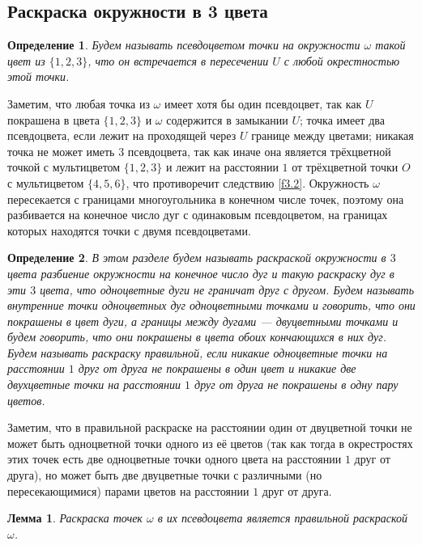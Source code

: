 \documentclass[12pt,a4paper]{article}
\newtheorem{mydef}{Определение}
\newtheorem{lemma}{Лемма}
\begin{document}
\subsection{Раскраска окружности в 3 цвета}

\begin{mydef}
	Будем называть псевдоцветом точки на окружности $\omega$ такой цвет из $\{1, 2, 3\}$, что он встречается в пересечении $U$ с любой окрестностью этой точки.
\end{mydef}

Заметим, что любая точка из $\omega$ имеет хотя бы один псевдоцвет, так как $U$ покрашена в цвета $\{1, 2, 3\}$ и $\omega$ содержится в замыкании $U$; точка имеет два псевдоцвета, если лежит на проходящей через $U$ границе между цветами; никакая точка не может иметь $3$ псевдоцвета, так как иначе она является трёхцветной точкой с мультицветом $\{1, 2, 3\}$ и лежит на расстоянии $1$ от трёхцветной точки $O$ с мультицветом $\{4, 5, 6\}$, что противоречит следствию \ref{f3.2}. Окружность $\omega$ пересекается с границами многоугольника в конечном числе точек, поэтому она разбивается на конечное число дуг с одинаковым псевдоцветом, на границах которых находятся точки с двумя псевдоцветами.

\begin{mydef}
	В этом разделе будем называть раскраской окружности в $3$ цвета разбиение окружности на конечное число дуг и такую раскраску дуг в эти $3$ цвета, что одноцветные дуги не граничат друг с другом. Будем называть внутренние точки одноцветных дуг одноцветными точками и говорить, что они покрашены в цвет дуги, а границы между дугами --- двуцветными точками и будем говорить, что они покрашены в цвета обоих кончающихся в них дуг. Будем называть раскраску правильной, если никакие одноцветные точки на расстоянии $1$ друг от друга не покрашены в один цвет и никакие две двухцветные точки на расстоянии $1$ друг от друга не покрашены в одну пару цветов.
\end{mydef}

Заметим, что в правильной раскраске на расстоянии один от двуцветной точки не может быть одноцветной точки одного из её цветов (так как тогда в окрестростях этих точек есть две одноцветные точки одного цвета на расстоянии $1$ друг от друга), но может быть две двуцветные точки с различными (но пересекающимися) парами цветов на расстоянии $1$ друг от друга.

\begin{lemma} \label{l5.1}
	Раскраска точек $\omega$ в их псевдоцвета является правильной раскраской $\omega$.
\end{lemma}
\end{document}
